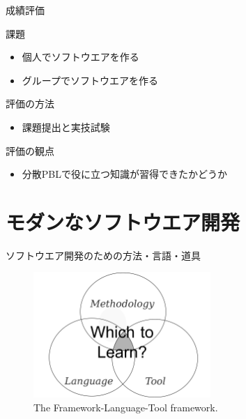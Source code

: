 \documentclass[t, aspectratio=169]{beamer}
\begin{document}
\begin{frame}[label=sec-1-3-2]{成績評価}
\begin{block}{課題}
\begin{itemize}
\item 個人でソフトウエアを作る
\item グループでソフトウエアを作る
\end{itemize}
\end{block}

\begin{block}{評価の方法}
\begin{itemize}
\item 課題提出と実技試験
\end{itemize}
\end{block}

\begin{block}{評価の観点}
\begin{itemize}
\item 分散PBLで役に立つ知識が習得できたかどうか
\end{itemize}
\end{block}
\end{frame}

\section{モダンなソフトウエア開発}
\label{sec-1-4}
\begin{frame}[label=sec-1-4-1]{ソフトウエア開発のための方法・言語・道具}
\begin{figure}[htb]
\centering
\includegraphics[width=0.6\textwidth]{./figures/FLT_framework.pdf}
\caption{\label{FLT_framework}The Framework-Language-Tool framework.}
\end{figure}
\end{frame}
\end{document}
